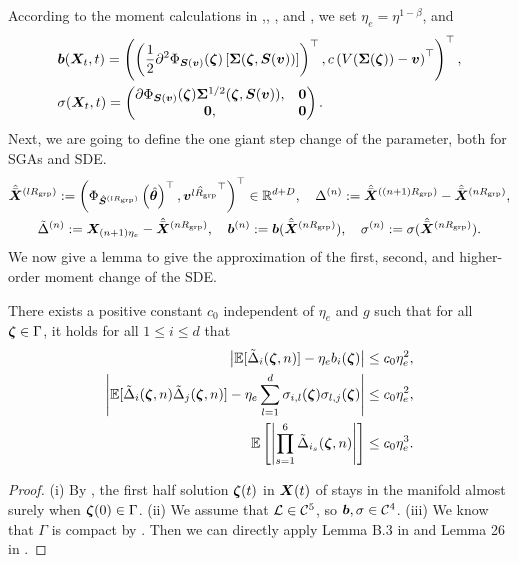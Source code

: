 According to the moment calculations in ,, , and , we set $\eta_e = \eta^{1-\beta}$, and
\begin{align*}
    &{\bm{b}}({\bm{X}}_t,t) = \left(\left(\frac{1}{2} \partial^2 \Phi_{{\bm{S}}({\bm{v}})}({\bm{\zeta}})\left[{\bm{\Sigma}}({\bm{\zeta}},{\bm{S}}({\bm{v}}))\right]\right)^{\top},c \left(V({\bm{\Sigma}}({\bm{\zeta}})) - {\bm{v}}\right)^{\top}\right)^{\top},\\
    &\mathbf{\sigma}({\bm{X}}_t,t)=\begin{pmatrix}
        \partial\Phi_{{\bm{S}}({\bm{v}})}({\bm{\zeta}}) {\bm{\Sigma}}^{1/2}({\bm{\zeta}},{\bm{S}}({\bm{v}})),& \boldsymbol{0}\\
         \boldsymbol{0}, & \boldsymbol{0}
    \end{pmatrix}.
\end{align*}
Next, we are going to define the one giant step change of the parameter, both for SGAs and SDE.
\begin{gather*}
\hat{\bar{{\bm{X}}}}^{(lR_{\mathrm{grp}})}:=\left(\Phi_{\hat{{\bm{S}}}^{(lR_{\mathrm{grp}})}}\left(\hat{{\bm{\theta}}}\right)^\top,\hat{{\bm{v}}^{lR_{\mathrm{grp}}}}^\top\right)^\top\in\mathbb{R}^{d+D},\quad \Delta^{(n)}:=\hat{\bar{{\bm{X}}}}^{((n+1)R_{\mathrm{grp}})} - \hat{\bar{{\bm{X}}}}^{(nR_{\mathrm{grp}})},\\
    \tilde\Delta^{(n)}:={\bm{X}}_{(n+1)\eta_e}-\hat{\bar{{\bm{X}}}}^{(nR_{\mathrm{grp}})},\quad {\bm{b}}^{(n)}:={\bm{b}}(\hat{\bar{{\bm{X}}}}^{(nR_{\mathrm{grp}})}), \quad \mathbf{\sigma}^{(n)}:= \mathbf{\sigma}(\hat{\bar{{\bm{X}}}}^{(nR_{\mathrm{grp}})}).
\end{gather*}
We now give a lemma to give the approximation of the first, second, and higher-order moment change of the SDE.
\begin{lemma}\label{lmm:SDE-Delta-bound}
    There exists a positive constant $c_0$ independent of $\eta_e$ and $g$ such that for all ${\bm{\zeta}}\in\Gamma$, it holds for all $1\le i \le d$ that
    \begin{align*}
        \left|\mathbb{E}[\tilde \Delta_i({\bm{\zeta}},n)]-\eta_eb_i({\bm{\zeta}})\right| \le c_0 \eta_e^2,\\
        \left|\mathbb{E}[\tilde \Delta_i({\bm{\zeta}},n)\tilde \Delta_j({\bm{\zeta}},n)]-\eta_e \sum_{l=1}^d\sigma_{i,l}({\bm{\zeta}})\sigma_{l,j}({\bm{\zeta}})\right| \le c_0 \eta_e^2,\\
        \mathbb{E}\left[\left|\prod_{s=1}^6\tilde\Delta_{i_{s}}({\bm{\zeta}},n)\right|\right] \le c_0 \eta_e^3.
    \end{align*}
\end{lemma}
\begin{proof}
    (i) By , the first half solution ${\bm{\zeta}}(t)$ in ${\bm{X}}(t)$ of  stays in the manifold almost surely when ${\bm{\zeta}}(0)\in\Gamma$. (ii) We assume that $\mathcal{L} \in \mathcal{C}^5$, so ${\bm{b}},\mathbf{\sigma}\in\mathcal{C}^{4}$. (iii) We know that $\Gamma$ is compact by . Then we can directly apply Lemma B.3 in \citet{malladi2022sdes} and Lemma 26 in \citet{li2019stochastic}.
\end{proof}
